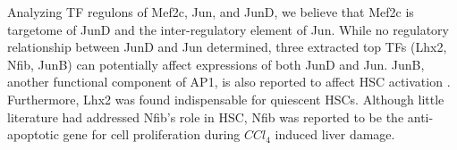 \documentclass[fleqn,10pt]{wlscirep}
\begin{document}
\begin{itemize}
        Analyzing TF regulons of Mef2c, Jun, and JunD, we believe that Mef2c is targetome of JunD and the inter-regulatory element of Jun.
        While no regulatory relationship between JunD and Jun determined, three extracted top TFs (Lhx2, Nfib, JunB) can potentially affect expressions of both JunD and Jun.
        JunB, another functional component of AP1, is also reported to  affect HSC activation \cite{ap1_hsc_5}.
        Furthermore, Lhx2 was found indispensable for quiescent HSCs. \cite{lhx2_fibro, Lhx2_hsc_1}
        Although little literature had addressed Nfib's role in HSC, Nfib was reported to be the anti-apoptotic gene for cell proliferation during $CCl_4$ induced liver damage. \cite{Nfib_sadly}

    \end{itemize}

\end{document}
